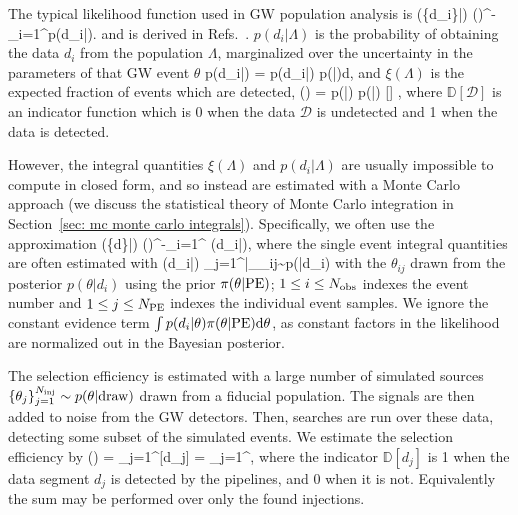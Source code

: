 The typical likelihood function used in \ac{GW} population analysis is 
\beq
{}(\{d_i\}|\Lambda) \propto \xi(\Lambda)^{-\Nobs}\prod_{i=1}^{\Nobs}p(d_i|\Lambda).
\label{eq: rate marginalized likelihood}
\eeq
and is derived in Refs.~\citep{Farr:2013yna,Mandel:2018mve,Vitale2020,Essick:2023upv}.
$p(d_i|\Lambda)$ is the probability of obtaining the data $d_i$ from the population $\Lambda$, marginalized over the uncertainty in the parameters of that \ac{GW} event $\theta$
\beq
p(d_i|\Lambda) = \int p(d_i|\theta) p(\theta|\Lambda)d\theta,
\label{eq: single event integral}
\eeq
and $\xi(\Lambda)$ is the expected fraction of events which are detected,
\beq
\xi(\Lambda) = \int p(\theta|\Lambda) p(|\theta) [] \dd\theta \dd{},
\label{eq: selection efficiency}
\eeq
where $\mathbb{D}[\mathcal{D}]$ is an indicator function which is 0 when the data $\mathcal{D}$ is undetected and 1 when the data is detected.

However, the integral quantities $\xi(\Lambda)$ and $p(d_i|\Lambda)$ are usually impossible to compute in closed form, and so instead are estimated with a Monte Carlo approach (we discuss the statistical theory of Monte Carlo integration in Section~\ref{sec: mc monte carlo integrals}). Specifically, we often use the approximation
\beq
{}(\{d\}|\Lambda) \propto \hat{\xi}(\Lambda)^{-\Nobs}\prod_{i=1}^{\Nobs} (d_i|\Lambda),
\label{eq: estimated hierarchical likelihood}
\eeq
where the single event integral quantities are often estimated with 
\beq
{}(d_i|\Lambda) \propto {}\sum_{j=1}^{\NPE}\bigg|_{\theta_{ij}\sim p(\theta|d_i)}
\label{eq: single event estimator}
\eeq
with the $\theta_{ij}$ drawn from the \PE posterior $p(\theta|d_i)$ using the prior $\pi(\theta|{\rm PE})$; $1\le i\le N_{\rm obs}$ indexes the event number and $1 \le j \le N_{\rm PE}$ indexes the individual event samples. We ignore the constant evidence term $\int p(d_i|\theta)\pi(\theta|{\rm PE})\dd\theta$, as constant factors in the likelihood are normalized out in the Bayesian posterior. 

The selection efficiency is estimated with a large number of simulated sources $\{\theta_j\}_{j=1}^{N_{\rm inj}} \sim p(\theta|{\rm draw})$ drawn from a fiducial population. The signals are then added to noise from the \ac{GW} detectors. Then, searches \citep[e.g.][]{Allen:2005fk, Usman:2015kfa, Messick:2016aqy} are run over these data, detecting some subset of the simulated events. We estimate the selection efficiency by \citep{Tiwari:2017ndi, Farr:2019rap}
\beq
\hat{\xi}(\Lambda) = \sum_{j=1}^{\Ninj}[d_j] = \sum_{j=1}^{\Nfound},
\label{eq: selection effects estimator}
\eeq
where the indicator $\mathbb{D}[d_j]$ is 1 when the data segment $d_j$ is detected by the pipelines, and 0 when it is not. Equivalently the sum may be performed over only the found injections. 

